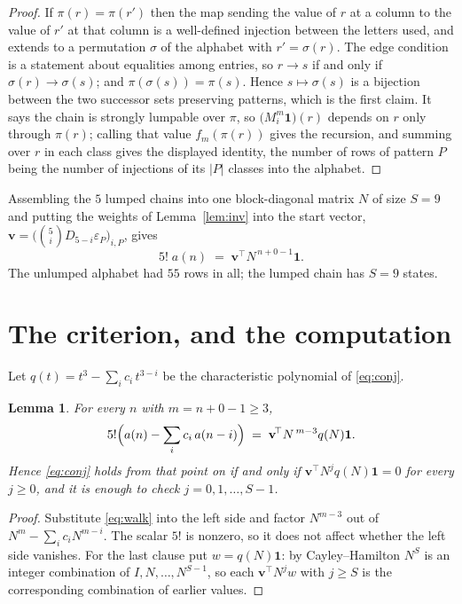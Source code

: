 \documentclass[11pt,a4paper]{article}
\theoremstyle{plain}
\newtheorem{lemma}[theorem]{Lemma}
\theoremstyle{definition}
\begin{document}
\begin{proof}
If $\pi(r)=\pi(r')$ then the map sending the value of $r$ at a column to the value of $r'$
at that column is a well-defined injection between the letters used, and extends to a
permutation $\sigma$ of the alphabet with $r'=\sigma(r)$. The edge condition is a statement
about equalities among entries, so $r\to s$ if and only if $\sigma(r)\to\sigma(s)$; and
$\pi(\sigma(s))=\pi(s)$. Hence $s\mapsto\sigma(s)$ is a bijection between the two successor
sets preserving patterns, which is the first claim. It says the chain is strongly lumpable
over $\pi$, so $\bigl(M_i^{m}\mathbf{1}\bigr)(r)$ depends on $r$ only through $\pi(r)$;
calling that value $f_m(\pi(r))$ gives the recursion, and summing over $r$ in each class
gives the displayed identity, the number of rows of pattern $P$ being the number of
injections of its $|P|$ classes into the alphabet.
\end{proof}

Assembling the $5$ lumped chains into one block-diagonal matrix $N$ of size $S=9$ and
putting the weights of Lemma~\ref{lem:inv} into the start vector,
$\mathbf{v}=\bigl(\binom{5}{i}D_{5-i}\varepsilon_P\bigr)_{i,P}$, gives
\begin{equation}\label{eq:walk}
5!\;a(n)\;=\;\mathbf{v}^{\!\top}N^{\,n+0-1}\mathbf{1} .
\end{equation}
The unlumped alphabet had $55$ rows in all; the lumped chain has $S=9$ states.

\section{The criterion, and the computation}

Let $q(t)=t^{3}-\sum_i c_i\,t^{3-i}$ be the characteristic polynomial of
\eqref{eq:conj}.

\begin{lemma}\label{lem:crit}
For every $n$ with $m=n+0-1\ge3$,
\[
5!\Bigl(a(n)-\sum_i c_i\,a(n-i)\Bigr)\;=\;\mathbf{v}^{\!\top}N^{\,m-3}q(N)\mathbf{1} .
\]
Hence \eqref{eq:conj} holds from that point on if and only if
$\mathbf{v}^{\!\top}N^{j}q(N)\mathbf{1}=0$ for every $j\ge0$, and it is enough to check
$j=0,1,\dots,S-1$.
\end{lemma}

\begin{proof}
Substitute \eqref{eq:walk} into the left side and factor $N^{m-3}$ out of
$N^{m}-\sum_i c_iN^{m-i}$. The scalar $5!$ is nonzero, so it does not affect whether
the left side vanishes. For the last clause put $w=q(N)\mathbf{1}$: by Cayley--Hamilton
$N^{S}$ is an integer combination of $I,N,\dots,N^{S-1}$, so each
$\mathbf{v}^{\!\top}N^{j}w$ with $j\ge S$ is the corresponding combination of earlier
values.
\end{proof}
\end{document}
